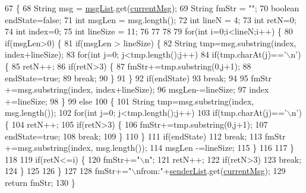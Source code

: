 \begin{DoxyCode}
67   \{
68     String msg = \hyperlink{classkr_1_1ac_1_1kookmin_1_1cs_1_1sms_1_1_sms_recv_ab66f609a7e9d8b44f412ce86f4201372}{msgList}.get(\hyperlink{classkr_1_1ac_1_1kookmin_1_1cs_1_1sms_1_1_sms_recv_a1c638ce05403d24764158c952cd08996}{currentMsg});
69     String fmStr = \textcolor{stringliteral}{""};
70     \textcolor{keywordtype}{boolean} endState=\textcolor{keyword}{false};
71     \textcolor{keywordtype}{int} msgLen = msg.length();
72     \textcolor{keywordtype}{int} lineN = 4;
73     \textcolor{keywordtype}{int} retN=0;
74     \textcolor{keywordtype}{int} index=0;
75     \textcolor{keywordtype}{int} lineSize = 11;
76 
77 
78 
79     \textcolor{keywordflow}{for}(\textcolor{keywordtype}{int} i=0;i<lineN;i++) \{
80       \textcolor{keywordflow}{if}(msgLen>0) \{
81         \textcolor{keywordflow}{if}(msgLen > lineSize) \{
82           String tmp=msg.substring(index, index+lineSize);
83           \textcolor{keywordflow}{for}(\textcolor{keywordtype}{int} j=0; j<tmp.length();j++)
84             \textcolor{keywordflow}{if}(tmp.charAt(j)==\textcolor{charliteral}{'\(\backslash\)n'}) \{
85               retN++;
86               \textcolor{keywordflow}{if}(retN>3) \{
87                 fmStr+=tmp.substring(0,j+1);
88                 endState=\textcolor{keyword}{true};
89                 \textcolor{keywordflow}{break};
90               \}
91             \}
92           \textcolor{keywordflow}{if}(endState)
93             \textcolor{keywordflow}{break};
94 
95           fmStr +=msg.substring(index, index+lineSize);
96           msgLen-=lineSize;
97           index +=lineSize;
98         \}
99         \textcolor{keywordflow}{else}
100         \{
101           String tmp=msg.substring(index, msg.length());
102           \textcolor{keywordflow}{for}(\textcolor{keywordtype}{int} j=0; j<tmp.length();j++)
103             \textcolor{keywordflow}{if}(tmp.charAt(j)==\textcolor{charliteral}{'\(\backslash\)n'}) \{
104               retN++;
105               \textcolor{keywordflow}{if}(retN>3) \{
106                 fmStr+=tmp.substring(0,j+1);
107                 endState=\textcolor{keyword}{true};
108                 \textcolor{keywordflow}{break};
109               \}
110             \}
111           \textcolor{keywordflow}{if}(endState)
112             \textcolor{keywordflow}{break};
113           fmStr +=msg.substring(index, msg.length());
114           msgLen -=lineSize;
115         \} 
116 
117       \}
118 
119       \textcolor{keywordflow}{if}(retN<=i) \{
120         fmStr+=\textcolor{stringliteral}{"\(\backslash\)n"};
121         retN++;
122         \textcolor{keywordflow}{if}(retN>3)
123           \textcolor{keywordflow}{break};
124       \}
125 
126     \}
127 
128     fmStr+=\textcolor{stringliteral}{"\(\backslash\)nfrom:"}+\hyperlink{classkr_1_1ac_1_1kookmin_1_1cs_1_1sms_1_1_sms_recv_a486abb44de1e3587a26c1c05d4eb96a8}{senderList}.get(\hyperlink{classkr_1_1ac_1_1kookmin_1_1cs_1_1sms_1_1_sms_recv_a1c638ce05403d24764158c952cd08996}{currentMsg});
129     \textcolor{keywordflow}{return} fmStr;
130   \}
\end{DoxyCode}


